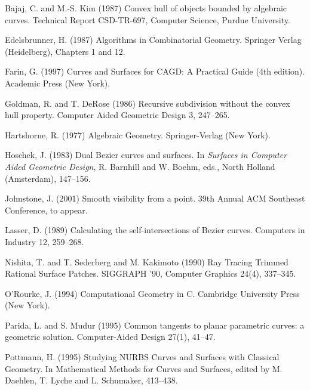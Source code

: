 \documentclass[10pt,twocolumn]{article}
\newif\ifJournal
\begin{document}

% 
\begin{thebibliography}{99}

Bajaj, C. and M.-S. Kim (1987)
Convex hull of objects bounded by algebraic curves.
Technical Report CSD-TR-697, Computer Science, Purdue University.

Edelsbrunner, H. (1987)
Algorithms in Combinatorial Geometry.
Springer Verlag (Heidelberg), Chapters 1 and 12.

Farin, G. (1997)
Curves and Surfaces for CAGD: A Practical Guide (4th edition).
Academic Press (New York).

Goldman, R. and T. DeRose (1986)
Recursive subdivision without the convex hull property.
Computer Aided Geometric Design 3, 247--265.

Hartshorne, R. (1977)
Algebraic Geometry.
Springer-Verlag (New York).

Hoschek, J. (1983)
Dual Bezier curves and surfaces.
In {\em Surfaces in Computer Aided Geometric Design},
R. Barnhill and W. Boehm, eds.,
North Holland (Amsterdam), 147--156.

Johnstone, J. (2001)
Smooth visibility from a point.
39th Annual ACM Southeast Conference, to appear.


Lasser, D. (1989)
Calculating the self-intersections of Bezier curves.
Computers in Industry 12, 259--268.

Nishita, T. and T. Sederberg and M. Kakimoto (1990)
Ray Tracing Trimmed Rational Surface Patches.
SIGGRAPH '90, Computer Graphics 24(4), 337--345.

O'Rourke, J. (1994)
Computational Geometry in C.
Cambridge University Press (New York).

Parida, L. and S. Mudur (1995)
Common tangents to planar parametric curves: a geometric solution.
Computer-Aided Design 27(1), 41--47.

Pottmann, H. (1995)
Studying NURBS Curves and Surfaces with Classical Geometry.
In Mathematical Methods for Curves and Surfaces,
edited by M. Daehlen, T. Lyche and L. Schumaker,
413--438.

\ifJournal
\bibitem{pottmann99}
Pottmann, H. and M. Peternell and B. Ravani (1999)
An introduction to line geometry with applications.
Computer-Aided Design 31, 3--16.
\fi


\end{thebibliography}
\end{document}
